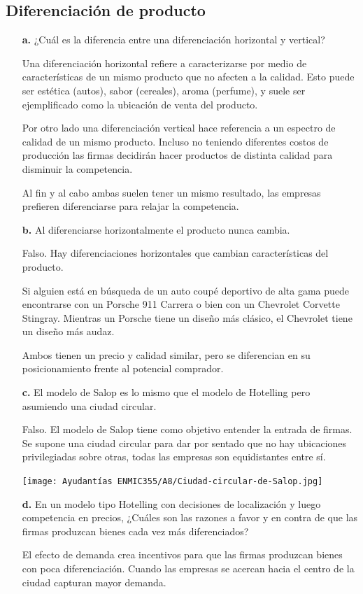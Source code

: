 \documentclass{exam}
\begin{document}
    \subsection{Diferenciación de producto}
    \begin{itemize}
    \item[\textbf{a.}] ¿Cuál es la diferencia entre una diferenciación horizontal y vertical?
    \begin{solution}
        Una diferenciación horizontal refiere a caracterizarse por medio de características de un mismo producto que no afecten a la calidad. Esto puede ser estética (autos), sabor (cereales), aroma (perfume), y suele ser ejemplificado como la ubicación de venta del producto.

        Por otro lado una diferenciación vertical hace referencia a un espectro de calidad de un mismo producto. Incluso no teniendo diferentes costos de producción las firmas decidirán hacer productos de distinta calidad para disminuir la competencia.

        Al fin y al cabo ambas suelen tener un mismo resultado, las empresas prefieren diferenciarse para relajar la competencia.
    \end{solution}
    \item[\textbf{b.}] Al diferenciarse horizontalmente el producto nunca cambia.
    \begin{solution}
        Falso. Hay diferenciaciones horizontales que cambian características del producto. 

        Si alguien está en búsqueda de un auto coupé deportivo de alta gama puede encontrarse con un Porsche 911 Carrera o bien con un Chevrolet Corvette Stingray. Mientras un Porsche tiene un diseño más clásico, el Chevrolet tiene un diseño más audaz. 

        Ambos tienen un precio y calidad similar, pero se diferencian en su posicionamiento frente al potencial comprador.
    \end{solution}
    \item[\textbf{c.}] El modelo de Salop es lo mismo que el modelo de Hotelling pero asumiendo una ciudad circular.
    \begin{solution}
        Falso. El modelo de Salop tiene como objetivo entender la entrada de firmas. Se supone una ciudad circular para dar por sentado que no hay ubicaciones privilegiadas sobre otras, todas las empresas son equidistantes entre sí. 
        \begin{center}
            \texttt{[image: Ayudantías ENMIC355/A8/Ciudad-circular-de-Salop.jpg]}
        \end{center}
    \end{solution}
    \item[\textbf{d.}] En un modelo tipo Hotelling con decisiones de localización y luego competencia en precios, ¿Cuáles son las razones a favor y en contra de que las firmas produzcan bienes cada vez más diferenciados?
    \begin{solution}
        El efecto de demanda crea incentivos para que las firmas produzcan bienes con poca diferenciación. Cuando las empresas se acercan hacia el centro de la ciudad capturan mayor demanda.
        

\end{solution}
\end{itemize}
\end{document}
